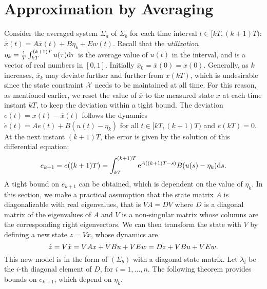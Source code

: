 \section{Approximation by Averaging} %
\label{sec:averaged-system}

Consider the averaged system $\Sigma_a$ of $\Sigma_b$ for each time interval $t \in [kT, (k + 1) T)$: $\dot{\overbar{x}} (t) = A \overbar{x} (t) + B \eta_k + Ew (t)$.
Recall that the \emph{utilization} $\eta_k = \frac{1}{T} \int_{kT}^{(k + 1) T} u (\tau) \mathrm{d} \tau$ is the average value of $u(t)$ in the interval, and is a vector of real numbers in $[0, 1]$. %
Initially $\overbar{x}_{0} = \overbar{x} (0) = x(0)$.
Generally, as $k$ increases, $\overbar{x}_{k}$ may deviate further and further from $x (kT)$, which is undesirable since the state constraint $\mathcal{X}$ needs to be maintained at all time.
For this reason, as mentioned earlier, we reset the value of $\overbar{x}$ to the measured state $x$ at each time instant $kT$, to keep the deviation within a tight bound.
The deviation $e (t) = x (t) - \overbar{x} (t)$ follows the dynamics
\begin{math}
  \dot{e} (t) %
  = Ae (t) + B (u (t) - \eta_k) \label{eq:err-dynamics}
\end{math}
for all $t \in [kT, (k + 1) T)$ and $e (kT) = 0$.
At the next instant $(k + 1) T$, the error is given by the solution of this differential equation: %
\begin{equation*}
e_{k+1} = e ((k + 1) T) = \int_{kT}^{(k + 1) T} \mathrm{e}^{A ((k + 1) T - s)} B (u (s) - \eta_k) \mathrm{d} s \text.
\end{equation*}
A tight bound on $e_{k+1}$ can be obtained, which is dependent on the value of $\eta_k$.
In this section, we make a practical assumption that the
state matrix $A$ is diagonalizable with real eigenvalues, that is $VA = DV$
where $D$ is a diagonal matrix of the eigenvalues of $A$ and $V$ is a non-singular matrix whose columns are the corresponding right eigenvectors.
We can then transform the state with $V$ by defining a new state $z = Vx$, whose dynamics are
\[ \dot{z} = V \dot{x} = VAx + VBu + VEw = Dz + VBu + VEw \text.\]
This new model is in the form of $(\Sigma_b)$ with a diagonal state matrix.
Let $\lambda_i$ be the $i$-th diagonal element of $D$, for $i = 1, \ldots, n$.
The following theorem provides bounds on $e_{k+1}$, which depend on $\eta_{k}$.

